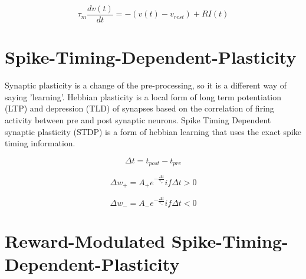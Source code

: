 

\begin{equation}
	\tau_m \frac{dv \left( t \right)}{dt} = - \left( v \left( t \right) - v_{rest} \right) + RI \left( t \right)
\end{equation}

\section{Spike-Timing-Dependent-Plasticity}

Synaptic plasticity is a change of the pre-processing, so it is a different way of saying 'learning'. Hebbian plasticity is a local form of long term potentiation (LTP) and depression (TLD) of synapses based on the correlation of firing activity between pre and post synaptic neurons. Spike Timing Dependent synaptic plasticity (STDP) is a form of hebbian learning that uses the exact spike timing information.

\begin{equation}
	\Delta t = t_{post} - t_{pre}
\end{equation}

\begin{equation}
	\Delta w_+ = A_+ e^{- \frac{\Delta t}{\tau_+}} if \Delta t > 0
\end{equation}

\begin{equation}
	\Delta w_- = A_- e^{- \frac{\Delta t}{\tau_-}} if \Delta t < 0
\end{equation}

\section{Reward-Modulated Spike-Timing-Dependent-Plasticity}
